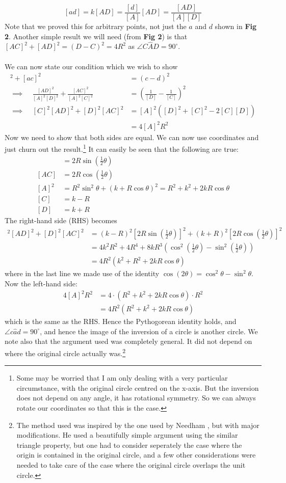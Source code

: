 $$[ad]=k[AD]=\frac{[d]}{[A]}[AD]=\frac{[AD]}{[A][D]}$$   
Note that we proved this for arbitrary points, not just the $a$ and $d$ shown in \textbf{Fig 2}. Another simple result we will need (from \textbf{Fig 2}) is that $[AC]^2+[AD]^2=(D-C)^2=4R^2$ as $\angle C\hat{A} D=90^\circ$. \\ \\
We can now state our condition which we wish to show
\begin{align*}
[ad]^2+[ac]^2&=(c-d)^2\\
\implies\ \ \ \ \ \frac{[AD]^2}{[A]^2[D]^2}+\frac{[AC]^2}{[A]^2[C]^2}&=\left(\frac{1}{[D]}-\frac{1}{[C]}\right)^2\\
\implies\ \ \ \ \ [C]^2[AD]^2+[D]^2[AC]^2&=[A]^2\left([D]^2+[C]^2-2[C][D]\right)\\
&=4[A]^2R^2
\end{align*} 
Now we need to show that both sides are equal. We can now use coordinates and just churn out the result.\footnote{Some may be worried that I am only dealing with a very particular circumstance, with the original circle centred on the x-axis. But the inversion does not depend on any angle, it has rotational symmetry. So we can always rotate our coordinates so that this is the case.} It can easily be seen that the following are true:
\begin{align*}
[AD]&=2R\sin(\frac{1}{2}\theta) \\
[AC]&=2R\cos(\frac{1}{2}\theta) \\
[A]^2&=R^2\sin^2\theta+(k+R\cos\theta)^2=R^2+k^2+2kR\cos\theta\\
[C]&=k-R \\
[D]&=k+R
\end{align*}
The right-hand side (RHS) becomes
\begin{align*}
[C]^2[AD]^2+[D]^2[AC]^2&=(k-R)^2[2R\sin(\frac{1}{2}\theta)]^2+(k+R)^2[2R\cos(\frac{1}{2}\theta)]^2\\
&=4k^2R^2+4R^4+8kR^3(\cos^2(\frac{1}{2}\theta)- \sin^2(\frac{1}{2}\theta))\\
&=4R^2(k^2+R^2+2kR \cos\theta)
\end{align*}
where in the last line we made use of the identity $\cos(2\theta)=\cos^2\theta-\sin^2\theta$. Now the left-hand side:
\begin{align*}
4[A]^2R^2&=4\cdot(R^2+k^2+2kR\cos\theta)\cdot R^2\\
&=4R^2(R^2+k^2+2kR\cos\theta)
\end{align*}
which is the same as the RHS. Hence the Pythogorean identity holds, and $\angle c\hat{a} d=90^{\circ}$, and hence the image of the inversion of a circle is another circle. We note also that the argument used was completely general. It did not depend on where the original circle actually was.\footnote{The method used was inspired by the one used by Needham \cite{need}, but with major modifications. He used a beautifully simple argument using the similar triangle property, but one had to consider seperately the case where the origin is contained in the original circle, and a few other considerations were needed to take care of the case where the original circle overlaps the unit circle.}  





